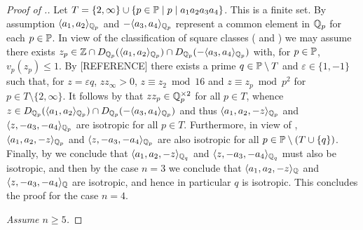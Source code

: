 \documentclass[12pt, leqno, british]{amsart}
\begin{document}
\begin{proof}[Proof of .]
Let $T = \lbrace 2, \infty \rbrace \cup \lbrace p \in \mathbb P \mid p\mid a_1a_2a_3a_4 \rbrace$.
This is a finite set.
By assumption $\langle a_1, a_2 \rangle_{\mathbb Q_p}$ and $-\langle a_3, a_4 \rangle_{\mathbb Q_p}$ represent a common element in $\mathbb Q_p$ for each $p \in \mathbb P$.
In view of the classification of square classes ( and ) we may assume there exists $z_p \in \mathbb Z \cap D_{\mathbb Q_p}(\langle a_1, a_2 \rangle_{\mathbb Q_p}) \cap D_{\mathbb Q_p}(-\langle a_3, a_4 \rangle_{\mathbb Q_p})$ with, for $p \in \mathbb P$, $v_p(z_p) \leq 1$.
By [REFERENCE] there exists a prime $q \in \mathbb P \setminus T$ and $\varepsilon \in \lbrace 1, -1 \rbrace$ such that, for $z = \varepsilon q$, $z z_\infty > 0$, $z \equiv z_2 \bmod 16$ and $z \equiv z_p \bmod p^2$ for $p \in T \setminus \lbrace 2, \infty \rbrace$.
It follows by  that $z z_p \in \mathbb Q_p^{\times 2}$ for all $p \in T$, whence $z \in  D_{\mathbb Q_p}(\langle a_1, a_2 \rangle_{\mathbb Q_p}) \cap D_{\mathbb Q_p}(-\langle a_3, a_4 \rangle_{\mathbb Q_p})$ and thus $\langle a_1, a_2, -z \rangle_{\mathbb Q_p}$ and $\langle z, -a_3, -a_4 \rangle_{\mathbb Q_p}$ are isotropic for all $p \in T$.
Furthermore, in view of , $\langle a_1, a_2, -z \rangle_{\mathbb Q_p}$ and $\langle z, -a_3, -a_4 \rangle_{\mathbb Q_p}$ are also isotropic for all $p \in \mathbb P \setminus (T \cup \lbrace q \rbrace)$.
Finally, by  we conclude that $\langle a_1, a_2, -z \rangle_{\mathbb Q_q}$ and $\langle z, -a_3, -a_4 \rangle_{\mathbb Q_q}$ must also be isotropic, and then by the case $n = 3$ we conclude that $\langle a_1, a_2, -z \rangle_{\mathbb Q}$ and $\langle z, -a_3, -a_4 \rangle_{\mathbb Q}$ are isotropic, and hence in particular $q$ is isotropic.
This concludes the proof for the case $n = 4$.

\emph{Assume $n \geq 5$.}

\end{proof}
\end{document}
